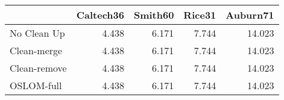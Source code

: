 \begin{tabular}{lrrrr}
\toprule
{} & Caltech36 & Smith60 & Rice31 & Auburn71 \\
\midrule
No Clean Up  &     4.438 &   6.171 &  7.744 &   14.023 \\
Clean-merge  &     4.438 &   6.171 &  7.744 &   14.023 \\
Clean-remove &     4.438 &   6.171 &  7.744 &   14.023 \\
OSLOM-full   &     4.438 &   6.171 &  7.744 &   14.023 \\
\bottomrule
\end{tabular}
